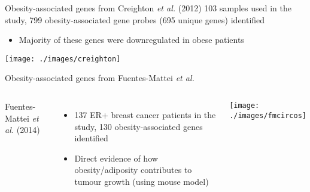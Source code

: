 \documentclass[handout]{beamer}
\begin{document}
\begin{frame}{{\normalsize Obesity-associated genes from Creighton \textit{et al.} (2012) }}
	103 samples used in the study, 799 obesity-associated gene probes (695 unique genes) identified\\
	{\footnotesize
		\begin{itemize}
			\item Majority of these genes were downregulated in obese patients
		\end{itemize}
	}
	\begin{center}
		\texttt{[image: ./images/creighton]}
	\end{center}
\end{frame}

\begin{frame}{Obesity-associated genes from Fuentes-Mattei \textit{et al.}}
	\begin{columns}
		Fuentes-Mattei \textit{et al.} (2014)
		\begin{itemize}
			\item 137 ER+ breast cancer patients in the study, 130 obesity-associated genes identified
			\item Direct evidence of how obesity/adiposity contributes to tumour growth (using mouse model)
		\end{itemize}
		\texttt{[image: ./images/fmcircos]}
	\end{columns}
\end{frame}


\end{document}
